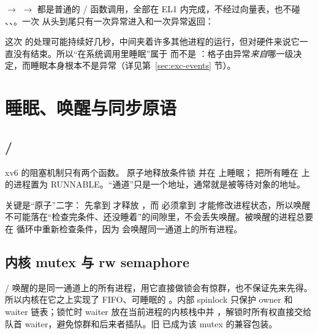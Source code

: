  $\to$  $\to$  都是普通的 / 函数调用，全部在 EL1 内完成，不经过向量表，也不碰 、、。一次  从头到尾只有一次异常进入和一次异常返回：


这次  的处理可能持续好几秒，中间夹着许多其他进程的运行，但对硬件来说它一直没有结束。所以“在系统调用里睡眠”属于  而不是 ：格子由异常\emph{来自}哪一级决定，而睡眠本身根本不是异常（详见第~\ref{sec:exc-events} 节）。

\section{睡眠、唤醒与同步原语}

\subsection{/}

xv6 的阻塞机制只有两个函数。 原子地释放条件锁  并在  上睡眠； 把所有睡在  上的进程置为 RUNNABLE。“通道”只是一个地址，通常就是被等待对象的地址。

关键是“原子”二字： 先拿到  才释放 ，而  必须拿到  才能修改进程状态，所以唤醒不可能落在“检查完条件、还没睡着”的间隙里，不会丢失唤醒。被唤醒的进程总要在  循环中重新检查条件，因为  会唤醒同一通道上的所有进程。

\subsection{内核 mutex 与 rw semaphore}

/ 唤醒的是同一通道上的所有进程，用它直接做锁会有惊群，也不保证先来先得。所以内核在它之上实现了 FIFO、可睡眠的 。内部 spinlock 只保护 owner 和 waiter 链表；锁忙时 waiter 放在当前进程的内核栈中并 ，解锁时所有权直接交给队首 waiter，避免惊群和后来者插队。旧  已成为该 mutex 的兼容包装。

